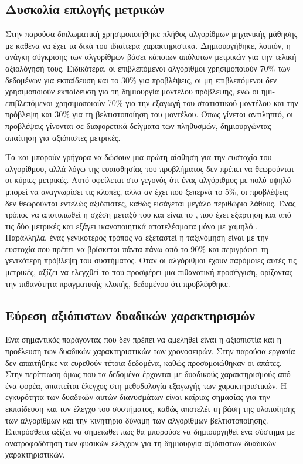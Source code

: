 \subsection{Δυσκολία επιλογής μετρικών}
Στην παρούσα διπλωματική χρησιμοποιήθηκε πλήθος αλγορίθμων μηχανικής μάθησης με καθένα να έχει τα δικά του ιδιαίτερα χαρακτηριστικά. Δημιουργήθηκε, λοιπόν, η ανάγκη σύγκρισης των αλγορίθμων βάσει κάποιων απόλυτων μετρικών για την τελική αξιολόγησή τους. Ειδικότερα, οι επιβλεπόμενοι αλγόριθμοι χρησιμοποιούν 70\% των δεδομένων για εκπαίδευση και το 30\% για προβλέψεις, οι μη επιβλεπόμενοι δεν χρησιμοποιούν εκπαίδευση για τη δημιουργία μοντέλου πρόβλεψης, ενώ οι ημι-επιβλεπόμενοι χρησιμοποιούν 70\% για την εξαγωγή του στατιστικού μοντέλου και την πρόβλεψη και 30\% για τη βελτιστοποίηση του μοντέλου. Όπως γίνεται αντιληπτό, οι προβλέψεις γίνονται σε διαφορετικά δείγματα των πληθυσμών, δημιουργώντας απαίτηση για αξιόπιστες μετρικές.\par
Τα  και  μπορούν γρήγορα να δώσουν μια πρώτη αίσθηση για την ευστοχία του αλγορίθμου, αλλά λόγω της ευαισθησίας του προβλήματος δεν πρέπει να θεωρούνται οι κύριες μετρικές. Αυτό οφείλεται στο γεγονός ότι ένας αλγόριθμος με πολύ υψηλό  μπορεί να αναγνωρίσει τις κλοπές, αλλά αν έχει  που ξεπερνά το 5\%, οι προβλέψεις δεν θεωρούνται εντελώς αξιόπιστες, καθώς εισάγεται μεγάλο περιθώριο λάθους. Ένας τρόπος να αποτυπωθεί η σχέση μεταξύ του  και  είναι το , που έχει εξάρτηση και από τις δύο μετρικές και εξάγει ικανοποιητικά αποτελέσματα μόνο με χαμηλό . Παράλληλα, ένας γενικότερος τρόπος να εξεταστεί η ταξινόμηση είναι με την ευστοχία  που πρέπει να βρίσκεται πάντα πάνω από το 90\% και περιγράφει τη γενικότερη πρόβλεψη του συστήματος. Όταν οι αλγόριθμοι έχουν παρόμοιες αυτές τις μετρικές, αξίζει να ελεγχθεί το  που προσφέρει μια πιθανοτική προσέγγιση, ορίζοντας την πιθανότητα πραγματικής κλοπής, δεδομένου ότι προβλέφθηκε.
\subsection{Εύρεση αξιόπιστων δυαδικών χαρακτηρισμών}
Ένα σημαντικός παράγοντας που δεν πρέπει να αμεληθεί είναι η αξιοπιστία και η προέλευση των δυαδικών χαρακτηριστικών των χρονοσειρών. Στην παρούσα εργασία δεν απαιτήθηκε να ευρεθούν τέτοια δεδομένα, καθώς προσομοιώθηκαν οι απάτες. Στην περίπτωση όμως που τα δεδομένα έρχονται με δυαδικούς χαρακτηρισμούς από ένα φορέα, απαιτείται έλεγχος στη μεθοδολογία εξαγωγής των χαρακτηριστικών. Η εγκυρότητα των δυαδικών αυτών διανυσμάτων είναι καίριας σημασίας για την εκπαίδευση και τον έλεγχο του συστήματος, καθώς αποτελέι τη βάση της υλοποίησης των αλγορίθμων και την κινητήριο δύναμη των αλγορίθμων βελτιστοποίησης. Επιπρόσθετα αξίζει να σημειωθεί πως θα μπορούσε να δημιουργηθεί ένα σύστημα με ανατροφοδότηση των φυσικών ελέγχων για τη δημιουργία αξιόπιστων δυαδικών χαρακτηριστικών.\par
